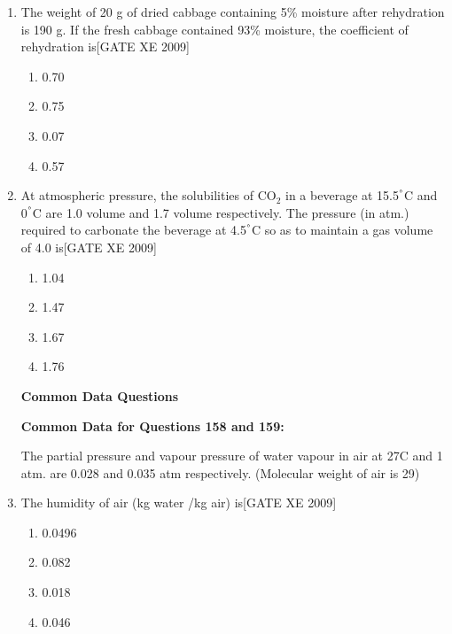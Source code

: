 \documentclass[journal,12pt,onecolumn]{IEEEtran}
\theoremstyle{remark}
\begin{document}
\begin{enumerate}
\item The weight of 20 g of dried cabbage containing 5\% moisture after rehydration is 190 g. If the fresh cabbage contained 93\% moisture, the coefficient of rehydration is\hfill[GATE XE 2009]

\begin{multicols}{2}
\begin{enumerate}
\item 0.70
\item 0.75
\item 0.07
\item 0.57
\end{enumerate}
\end{multicols}

\item At atmospheric pressure, the solubilities of CO$_2$ in a beverage at 15.5$^\degree$C and 0$^\degree$C are 1.0 volume and 1.7 volume respectively. The pressure (in atm.) required to carbonate the beverage at 4.5$^\degree$C so as to maintain a gas volume of 4.0 is\hfill[GATE XE 2009]

\begin{multicols}{2}
\begin{enumerate}
\item 1.04
\item 1.47
\item 1.67
\item 1.76
\end{enumerate}
\end{multicols}


\noindent\textbf{Common Data Questions}

\textbf{Common Data for Questions 158 and 159:}


The partial pressure and vapour pressure of water vapour in air at 27{\degree}C and 1 atm. are 0.028 and 0.035 atm respectively. (Molecular weight of air is 29)

\item The humidity of air (kg water /kg air) is\hfill[GATE XE 2009]

\begin{multicols}{2}
\begin{enumerate}
\item 0.0496
\item 0.082
\item 0.018
\item 0.046
\end{enumerate}
\end{multicols}


\end{enumerate}
\end{document}
